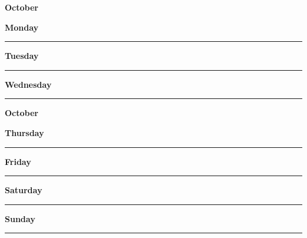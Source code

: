 \newpage

\textbf{\Large{October} \hfill \Large{}}
\vspace{0.3cm}

\begin{daybox}
 \textbf{Monday} \\
\rule{\linewidth}{0.02cm}
\end{daybox}

\begin{daybox}
\textbf{Tuesday} \\
\rule{\linewidth}{0.02cm}
\end{daybox}

\begin{daybox}
\textbf{Wednesday} \\
\rule{\linewidth}{0.02cm}
\end{daybox}

\newpage

\textbf{\Large{October} \hfill \Large{}}
\vspace{0.3cm}

\begin{daybox}
\textbf{Thursday} \\
\rule{\linewidth}{0.02cm}
\end{daybox}

\begin{daybox}
\textbf{Friday} \\
\rule{\linewidth}{0.02cm}
\end{daybox}

\begin{weekendbox}
\textbf{Saturday} \\
\rule{\linewidth}{0.02cm}
\tcblower
{}
\textbf{Sunday} \\
\rule{\linewidth}{0.02cm}
\end{weekendbox}